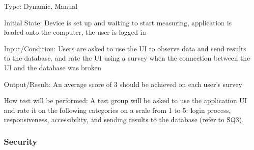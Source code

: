 \documentclass[12pt, titlepage]{article}
\begin{document}
\begin{enumerate}
Type: Dynamic, Manual
					
Initial State: Device is set up and waiting to start measuring, application is loaded onto the computer, the user is logged in
					
Input/Condition: Users are asked to use the UI to observe data and send results to the database, and rate the UI using a survey when the connection between the UI and the database was broken
					
Output/Result: An average score of 3 should be achieved on each user's survey
					
How test will be performed: A test group will be asked to use the application UI and rate it on the following categories on a scale from 1 to 5: login process, responsiveness, accessibility, and sending results to the database (refer to SQ3).

					
					
					
					

\end{enumerate}

\subsubsection{Security}
\end{document}
